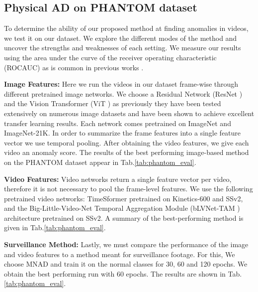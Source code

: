 \documentclass{article}
\begin{document}
\subsection{Physical AD on PHANTOM dataset}

To determine the ability of our proposed method at finding anomalies in videos, we test it on our dataset. We explore the different modes of the method and uncover the strengths and weaknesses of each setting. We measure our results using the area under the curve of the receiver operating characteristic (ROCAUC) as is common in previous works \cite{reiss2021panda,hendrycks2019using}.


\textbf{Image Features: }Here we run the videos in our dataset frame-wise through different pretrained image networks. We choose a Residual Network (ResNet \cite{he2016deep}) and the Vision Transformer (ViT \cite{dosovitskiy2020image}) as previously they have been tested extensively on numerous image datasets and have been shown to achieve excellent transfer learning results. Each network comes pretrained on ImageNet and ImageNet-21K. In order to summarize the frame features into a single feature vector we use temporal pooling. After obtaining the video features, we give each video an anomaly score. The results of the best performing image-based method on the PHANTOM dataset appear in Tab.\ref{tab:phantom_eval}. 

\textbf{Video Features: }Video networks return a single feature vector per video, therefore it is not necessary to pool the frame-level features. We use the following pretrained video networks: TimeSformer \cite{bertasius2021space} pretrained on Kinetics-600 \cite{carreira2018short} and SSv2, and the Big-Little-Video-Net Temporal Aggregation Module (bLVNet-TAM \cite{fan2019more}) architecture pretrained on SSv2. A summary of the best-performing method is given in Tab.\ref{tab:phantom_eval}. 

\textbf{Surveillance Method: } Lastly, we must compare the performance of the image and video features to a method meant for surveillance footage. For this, We choose MNAD and train it on the normal classes for 30, 60 and 120 epochs. We obtain the best performing run with 60 epochs. The results are shown in Tab.\ref{tab:phantom_eval}.
\end{document}
